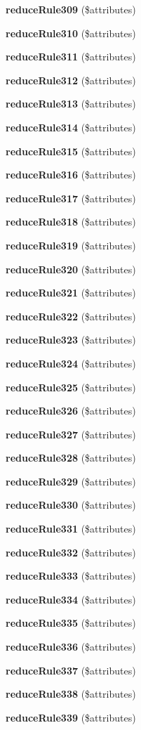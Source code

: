 \begin{DoxyCompactItemize}
\item 
{\bf reduce\+Rule309} (\$attributes)
\item 
{\bf reduce\+Rule310} (\$attributes)
\item 
{\bf reduce\+Rule311} (\$attributes)
\item 
{\bf reduce\+Rule312} (\$attributes)
\item 
{\bf reduce\+Rule313} (\$attributes)
\item 
{\bf reduce\+Rule314} (\$attributes)
\item 
{\bf reduce\+Rule315} (\$attributes)
\item 
{\bf reduce\+Rule316} (\$attributes)
\item 
{\bf reduce\+Rule317} (\$attributes)
\item 
{\bf reduce\+Rule318} (\$attributes)
\item 
{\bf reduce\+Rule319} (\$attributes)
\item 
{\bf reduce\+Rule320} (\$attributes)
\item 
{\bf reduce\+Rule321} (\$attributes)
\item 
{\bf reduce\+Rule322} (\$attributes)
\item 
{\bf reduce\+Rule323} (\$attributes)
\item 
{\bf reduce\+Rule324} (\$attributes)
\item 
{\bf reduce\+Rule325} (\$attributes)
\item 
{\bf reduce\+Rule326} (\$attributes)
\item 
{\bf reduce\+Rule327} (\$attributes)
\item 
{\bf reduce\+Rule328} (\$attributes)
\item 
{\bf reduce\+Rule329} (\$attributes)
\item 
{\bf reduce\+Rule330} (\$attributes)
\item 
{\bf reduce\+Rule331} (\$attributes)
\item 
{\bf reduce\+Rule332} (\$attributes)
\item 
{\bf reduce\+Rule333} (\$attributes)
\item 
{\bf reduce\+Rule334} (\$attributes)
\item 
{\bf reduce\+Rule335} (\$attributes)
\item 
{\bf reduce\+Rule336} (\$attributes)
\item 
{\bf reduce\+Rule337} (\$attributes)
\item 
{\bf reduce\+Rule338} (\$attributes)
\item 
{\bf reduce\+Rule339} (\$attributes)

\end{DoxyCompactItemize}

